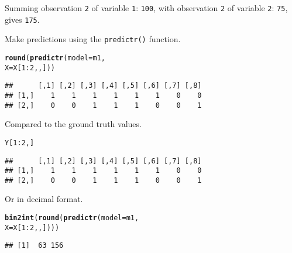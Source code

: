 \documentclass[english,article]{article}\usepackage[]{graphicx}\usepackage[]{color}
\makeatletter
\newcommand{\hlnum}[1]{\textcolor[rgb]{0.686,0.059,0.569}{#1}}%
\newcommand{\hlopt}[1]{\textcolor[rgb]{0,0,0}{#1}}%
\newcommand{\hlstd}[1]{\textcolor[rgb]{0.345,0.345,0.345}{#1}}%
\newcommand{\hlkwc}[1]{\textcolor[rgb]{0.333,0.667,0.333}{#1}}%
\newcommand{\hlkwd}[1]{\textcolor[rgb]{0.737,0.353,0.396}{\textbf{#1}}}%
\newenvironment{kframe}{%
 \def\at@end@of@kframe{}%
 \ifinner\ifhmode%
  \def\at@end@of@kframe{\end{minipage}}%
  \begin{minipage}{\columnwidth}%
 \fi\fi%
 \def\FrameCommand##1{\hskip\@totalleftmargin \hskip-\fboxsep
 \colorbox{shadecolor}{##1}\hskip-\fboxsep
     \hskip-\linewidth \hskip-\@totalleftmargin \hskip\columnwidth}%
 \MakeFramed {\advance\hsize-\width
   \@totalleftmargin\z@ \linewidth\hsize
   \@setminipage}}%
 {\par\unskip\endMakeFramed%
 \at@end@of@kframe}
\newenvironment{knitrout}{}{} %
\providecommand*{\code}[1]{\texttt{#1}}
\makeatother
\begin{document}
Summing observation \code{2} of variable \code{1}: \code{100},
with observation \code{2} of variable \code{2}: \code{75}, gives
\code{175}.

Make predictions using the \code{predictr()} function.

\begin{knitrout}
\color{fgcolor}\begin{kframe}
\begin{alltt}
\hlkwd{round}\hlstd{(} \hlkwd{predictr}\hlstd{(}\hlkwc{model} \hlstd{= m1,}
                \hlkwc{X}     \hlstd{= X[}\hlnum{1}\hlopt{:}\hlnum{2}\hlstd{,,] ) )}
\end{alltt}
\begin{verbatim}
##      [,1] [,2] [,3] [,4] [,5] [,6] [,7] [,8]
## [1,]    1    1    1    1    1    1    0    0
## [2,]    0    0    1    1    1    0    0    1
\end{verbatim}
\end{kframe}
\end{knitrout}

Compared to the ground truth values.

\begin{knitrout}
\color{fgcolor}\begin{kframe}
\begin{alltt}
\hlstd{Y[}\hlnum{1}\hlopt{:}\hlnum{2}\hlstd{,]}
\end{alltt}
\begin{verbatim}
##      [,1] [,2] [,3] [,4] [,5] [,6] [,7] [,8]
## [1,]    1    1    1    1    1    1    0    0
## [2,]    0    0    1    1    1    0    0    1
\end{verbatim}
\end{kframe}
\end{knitrout}

Or in decimal format.

\begin{knitrout}
\color{fgcolor}\begin{kframe}
\begin{alltt}
\hlkwd{bin2int}\hlstd{(}\hlkwd{round}\hlstd{(} \hlkwd{predictr}\hlstd{(}\hlkwc{model} \hlstd{= m1,}
                        \hlkwc{X}     \hlstd{= X[}\hlnum{1}\hlopt{:}\hlnum{2}\hlstd{,,] ) ) )}
\end{alltt}
\begin{verbatim}
## [1]  63 156
\end{verbatim}
\end{kframe}
\end{knitrout}
\end{document}
